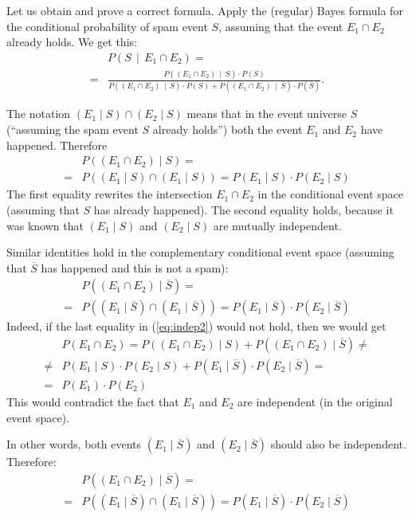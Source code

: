 \documentclass[jou]{apa6}
\begin{document}
Let us obtain and prove a correct formula. 
Apply the (regular) Bayes formula for the conditional probability of spam event $S$, assuming that 
the event $E_1 \cap E_2$ already holds. We get this:
\begin{align}
 & P\left( S \,\mid\, E_1 \cap E_2 \right) = \nonumber \\
= & \frac{P((E_1 \cap E_2) \,\mid\, S) \cdot P(S)}{P((E_1 \cap E_2) \,\mid\, S) \cdot P(S)
+ P((E_1 \cap E_2) \,\mid\, \overline{S}) \cdot P(\overline{S})}. \label{eq:bayes1}
\end{align}



The notation $(E_1 \mid S) \cap (E_2 \mid S)$ means that in the event universe $S$ 
(``assuming the spam event $S$ already holds'')
both the event $E_1$ and $E_2$ have happened. Therefore
\begin{align}
 & P((E_1 \cap E_2) \mid S) = \nonumber \\
= & P((E_1 \mid S) \cap (E_1 \mid S)) = P(E_1 \mid S) \cdot P(E_2 \mid S) \label{eq:indep1}
\end{align}
The first equality rewrites the intersection $E_1 \cap E_2$ in the 
conditional event space (assuming that $S$ has already happened).
The second equality holds, because 
it was known that $(E_1 \mid S)$ and $(E_2 \mid S)$ are mutually independent. 

Similar identities hold in the complementary conditional event space 
(assuming that $\overline{S}$ has happened and this is not a spam): 
\begin{align}
 & P((E_1 \cap E_2) \mid \overline{S}) = \nonumber \\
= & P((E_1 \mid \overline{S}) \cap (E_1 \mid \overline{S})) = 
P(E_1 \mid \overline{S}) \cdot P(E_2 \mid \overline{S}) \label{eq:indep2}
\end{align}
Indeed, if the last equality in (\ref{eq:indep2}) would not hold, then we would get 
\begin{align}
 & P(E_1 \cap E_2) = P((E_1 \cap E_2) \mid S) + P((E_1 \cap E_2) \mid \overline{S}) \neq \nonumber \\
\neq &  P(E_1 \mid S) \cdot P(E_2 \mid S) + P(E_1 \mid \overline{S}) \cdot P(E_2 \mid \overline{S}) = \nonumber \\
= & P(E_1) \cdot P(E_2) \label{eq:indep3}
\end{align}
This would contradict the fact that $E_1$ and $E_2$ are independent (in the original event space).

In other words, both events $(E_1 \mid \overline{S})$ and $(E_2 \mid \overline{S})$ should also be independent. Therefore: 
\begin{align}
 & P((E_1 \cap E_2) \mid \overline{S}) = \nonumber \\
= & P((E_1 \mid \overline{S}) \cap (E_1 \mid \overline{S})) = P(E_1 \mid \overline{S}) \cdot P(E_2 \mid \overline{S}) \nonumber 
\end{align}
\end{document}
